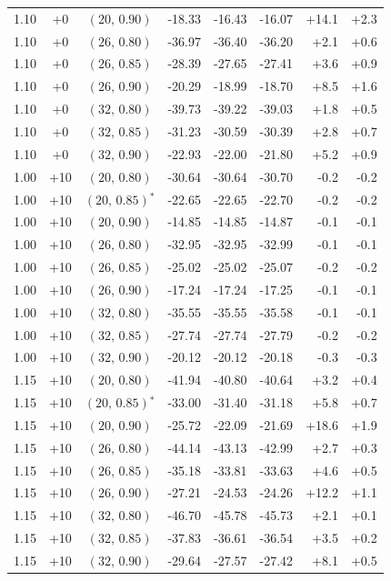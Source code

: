 \begin{table}[H]
\begin{tabular}{cccrrrrr}
1.10 & +0 & $(20,\,0.90)$ & -18.33 & -16.43 & -16.07 & +14.1 & +2.3 \\
1.10 & +0 & $(26,\,0.80)$ & -36.97 & -36.40 & -36.20 & +2.1 & +0.6 \\
1.10 & +0 & $(26,\,0.85)$ & -28.39 & -27.65 & -27.41 & +3.6 & +0.9 \\
1.10 & +0 & $(26,\,0.90)$ & -20.29 & -18.99 & -18.70 & +8.5 & +1.6 \\
1.10 & +0 & $(32,\,0.80)$ & -39.73 & -39.22 & -39.03 & +1.8 & +0.5 \\
1.10 & +0 & $(32,\,0.85)$ & -31.23 & -30.59 & -30.39 & +2.8 & +0.7 \\
1.10 & +0 & $(32,\,0.90)$ & -22.93 & -22.00 & -21.80 & +5.2 & +0.9 \\
\hline
1.00 & +10 & $(20,\,0.80)$ & -30.64 & -30.64 & -30.70 & -0.2 & -0.2 \\
1.00 & +10 & $(20,\,0.85)$$^\ast$ & -22.65 & -22.65 & -22.70 & -0.2 & -0.2 \\
1.00 & +10 & $(20,\,0.90)$ & -14.85 & -14.85 & -14.87 & -0.1 & -0.1 \\
1.00 & +10 & $(26,\,0.80)$ & -32.95 & -32.95 & -32.99 & -0.1 & -0.1 \\
1.00 & +10 & $(26,\,0.85)$ & -25.02 & -25.02 & -25.07 & -0.2 & -0.2 \\
1.00 & +10 & $(26,\,0.90)$ & -17.24 & -17.24 & -17.25 & -0.1 & -0.1 \\
1.00 & +10 & $(32,\,0.80)$ & -35.55 & -35.55 & -35.58 & -0.1 & -0.1 \\
1.00 & +10 & $(32,\,0.85)$ & -27.74 & -27.74 & -27.79 & -0.2 & -0.2 \\
1.00 & +10 & $(32,\,0.90)$ & -20.12 & -20.12 & -20.18 & -0.3 & -0.3 \\
\hline
1.15 & +10 & $(20,\,0.80)$ & -41.94 & -40.80 & -40.64 & +3.2 & +0.4 \\
1.15 & +10 & $(20,\,0.85)$$^\ast$ & -33.00 & -31.40 & -31.18 & +5.8 & +0.7 \\
1.15 & +10 & $(20,\,0.90)$ & -25.72 & -22.09 & -21.69 & +18.6 & +1.9 \\
1.15 & +10 & $(26,\,0.80)$ & -44.14 & -43.13 & -42.99 & +2.7 & +0.3 \\
1.15 & +10 & $(26,\,0.85)$ & -35.18 & -33.81 & -33.63 & +4.6 & +0.5 \\
1.15 & +10 & $(26,\,0.90)$ & -27.21 & -24.53 & -24.26 & +12.2 & +1.1 \\
1.15 & +10 & $(32,\,0.80)$ & -46.70 & -45.78 & -45.73 & +2.1 & +0.1 \\
1.15 & +10 & $(32,\,0.85)$ & -37.83 & -36.61 & -36.54 & +3.5 & +0.2 \\
1.15 & +10 & $(32,\,0.90)$ & -29.64 & -27.57 & -27.42 & +8.1 & +0.5 \\
\hline
\end{tabular}
\end{table}
